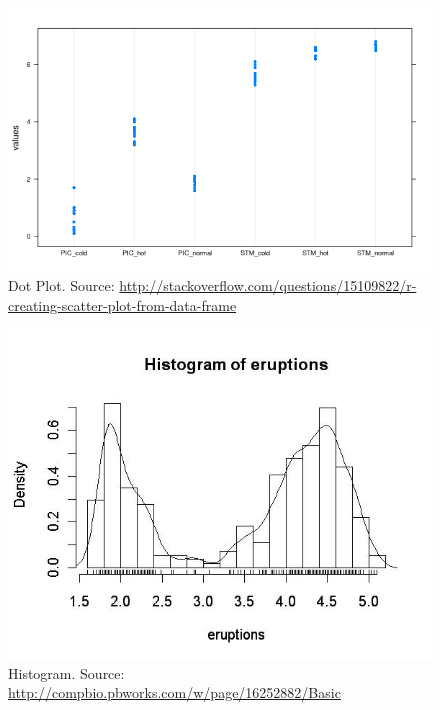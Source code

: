 \documentclass[12pt,a4paper]{report}
\begin{document}
 
\begin{figure}[h]
\centering
\includegraphics[height=0.3\textheight]{art/lmCm0}
\caption[Dot Plot]{Dot Plot. Source: \url{http://stackoverflow.com/questions/15109822/r-creating-scatter-plot-from-data-frame}}
\label{fig:dot_plot}
\end{figure}



\begin{figure}[h]
\centering
\includegraphics[height=0.3\textheight]{art/histogram_eruptions}
\caption[Histogram]{Histogram. Source: \url{http://compbio.pbworks.com/w/page/16252882/Basic}}
\label{fig:histogram_eruptions}
\end{figure}
\end{document}
